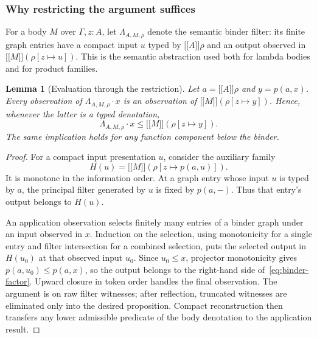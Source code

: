 \documentclass[11pt,a4paper]{article}
\newtheorem{lemma}[theorem]{Lemma}
\theoremstyle{definition}
\theoremstyle{remark}
\newcommand{\ev}[1]{\mathopen{[\![}#1\mathclose{]\!]}}
\newcommand{\appl}{\mathbin{\cdot}}
\begin{document}
\subsubsection{Why restricting the argument suffices}

For a body $M$ over $\Gamma,z:A$, let $\Lambda_{A,M,\rho}$ denote the
semantic binder filter: its finite graph entries have a compact input
$u$ typed by $\ev A\rho$ and an output observed in
$\ev M(\rho[z\mapsto u])$. This is the semantic abstraction used both
for lambda bodies and for product families.

\begin{lemma}[Evaluation through the restriction]\label{lem:binder-factor}
Let $a=\ev A\rho$ and $y=p(a,x)$. Every observation of
$\Lambda_{A,M,\rho}\appl x$ is an observation of
$\ev M(\rho[z\mapsto y])$. Hence, whenever the latter is a typed
denotation,
\begin{equation}\label{eq:binder-factor}
 \Lambda_{A,M,\rho}\appl x\leq\ev M(\rho[z\mapsto y]).
\end{equation}
The same implication holds for any function component below the binder.
\end{lemma}
\begin{proof}
For a compact input presentation $u$, consider the auxiliary family
\[
 H(u)=\ev M(\rho[z\mapsto p(a,u)]).
\]
It is monotone in the information order. At a graph entry whose input
$u$ is typed by $a$, the principal filter generated by $u$ is fixed by
$p(a,-)$. Thus that entry's output belongs to $H(u)$.

An application observation selects finitely many entries of a binder
graph under an input observed in $x$. Induction on the selection,
using monotonicity for a single entry and filter intersection for a
combined selection, puts the selected output in $H(u_0)$ at that
observed input $u_0$. Since $u_0\leq x$, projector monotonicity gives
$p(a,u_0)\leq p(a,x)$, so the output belongs to the right-hand side
of~\eqref{eq:binder-factor}. Upward closure in token order handles the
final observation. The argument is on raw filter witnesses; after
reflection, truncated witnesses are eliminated only into the desired
proposition. Compact reconstruction then transfers any lower admissible
predicate of the body denotation to the application result.
\end{proof}
\end{document}
